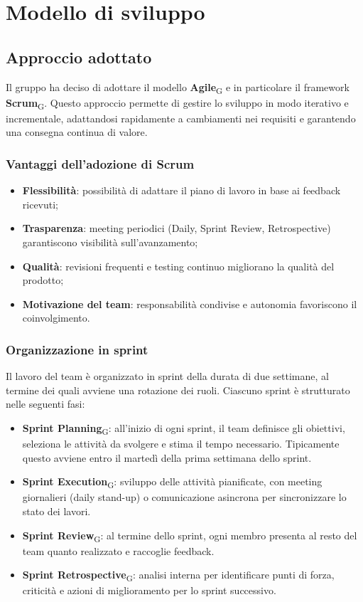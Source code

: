 \documentclass[11pt,a4paper]{article}
\begin{document}
\newpage

\section{Modello di sviluppo}
\subsection{Approccio adottato}
Il gruppo ha deciso di adottare il modello \textbf{Agile}\textsubscript{G} e in particolare il framework \textbf{Scrum}\textsubscript{G}. Questo approccio permette di gestire lo sviluppo in modo iterativo e incrementale, adattandosi rapidamente a cambiamenti nei requisiti e garantendo una consegna continua di valore.

\subsubsection{Vantaggi dell'adozione di Scrum}
\begin{itemize}
    \item \textbf{Flessibilità}: possibilità di adattare il piano di lavoro in base ai feedback ricevuti;
    \item \textbf{Trasparenza}: meeting periodici (Daily, Sprint Review, Retrospective) garantiscono visibilità sull’avanzamento;
    \item \textbf{Qualità}: revisioni frequenti e testing continuo migliorano la qualità del prodotto;
    \item \textbf{Motivazione del team}: responsabilità condivise e autonomia favoriscono il coinvolgimento.
\end{itemize}

\subsubsection{Organizzazione in sprint}
Il lavoro del team è organizzato in sprint della durata di due settimane, al termine dei quali avviene una rotazione dei ruoli. Ciascuno sprint è strutturato nelle seguenti fasi:
\begin{itemize}
    \item \textbf{Sprint Planning}\textsubscript{G}: all’inizio di ogni sprint, il team definisce gli obiettivi, seleziona le attività da svolgere e stima il tempo necessario. Tipicamente questo avviene entro il martedì della prima settimana dello sprint.
    \item \textbf{Sprint Execution}\textsubscript{G}: sviluppo delle attività pianificate, con meeting giornalieri (daily stand-up) o comunicazione asincrona per sincronizzare lo stato dei lavori.
    \item \textbf{Sprint Review}\textsubscript{G}: al termine dello sprint, ogni membro presenta al resto del team quanto realizzato e raccoglie feedback.
    \item \textbf{Sprint Retrospective}\textsubscript{G}: analisi interna per identificare punti di forza, criticità e azioni di miglioramento per lo sprint successivo.
\end{itemize}
\end{document}
